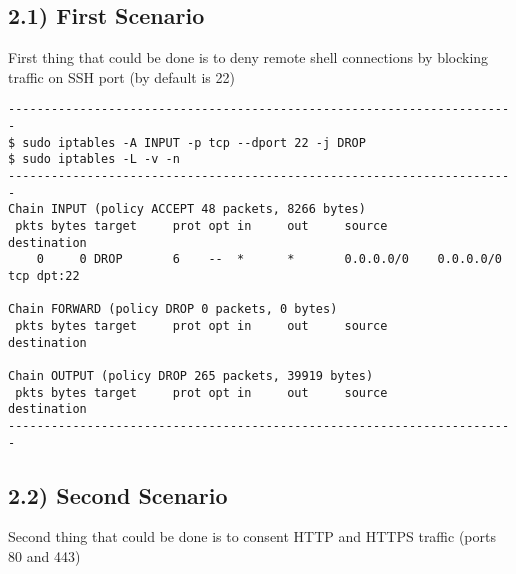 \documentclass{article}
\begin{document}
\subsection*{2.1) First Scenario}
First thing that could be done is to deny remote shell connections by blocking traffic on SSH port (by default is 22)\\

\begin{verbatim}
-----------------------------------------------------------------------
$ sudo iptables -A INPUT -p tcp --dport 22 -j DROP
$ sudo iptables -L -v -n
-----------------------------------------------------------------------
Chain INPUT (policy ACCEPT 48 packets, 8266 bytes)
 pkts bytes target     prot opt in     out     source       destination         
    0     0 DROP       6    --  *      *       0.0.0.0/0    0.0.0.0/0        tcp dpt:22

Chain FORWARD (policy DROP 0 packets, 0 bytes)
 pkts bytes target     prot opt in     out     source       destination         

Chain OUTPUT (policy DROP 265 packets, 39919 bytes)
 pkts bytes target     prot opt in     out     source       destination  
-----------------------------------------------------------------------
\end{verbatim}

\subsection*{2.2) Second Scenario}
Second thing that could be done is to consent HTTP and HTTPS traffic (ports 80 and 443)\\
\end{document}
